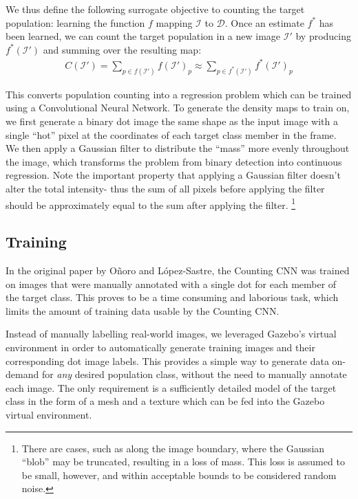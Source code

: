 \documentclass[10pt,twocolumn,letterpaper]{article}
\newcommand{\I}{\mathcal{I}}
\newcommand{\D}{\mathcal{D}}
\begin{document}
  We thus define the following surrogate objective to counting the target
  population: learning the function $f$ mapping $\I$ to $\D$. Once an estimate
  $f^*$ has been learned, we can count the target population in a new image
  $\I'$ by producing $f^*(\I')$ and summing over the resulting map:
  \begin{align}
    C(\I') = \sum_{p \in f(\I')} {f(\I')}_p \approx \sum_{p \in f^*(\I')}
      {f^*(\I')}_p
  \end{align}

  This converts population counting into a regression problem which can be
  trained using a Convolutional Neural Network. To generate the density maps to
  train on, we first generate a binary dot image the same shape as the input
  image with a single ``hot'' pixel at the coordinates of each target class
  member in the frame. We then apply a Gaussian filter to distribute the
  ``mass'' more evenly throughout the image, which transforms the problem from
  binary detection into continuous regression. Note the important property that
  applying a Gaussian filter doesn't alter the total intensity- thus the
  sum of all pixels before applying the filter should be approximately equal to
  the sum after applying the filter. \footnote{There are cases, such as along
  the image boundary, where the Gaussian ``blob'' may be truncated, resulting
  in a loss of mass. This loss is assumed to be small, however, and within
  acceptable bounds to be considered random noise.}


\subsection{Training}


  In the original paper by O\~noro and L\'opez-Sastre, the Counting CNN was
  trained on images that were manually annotated with a single dot for each
  member of the target class. This proves to be a time consuming and laborious
  task, which limits the amount of training data usable by the Counting CNN.

  Instead of manually labelling real-world images, we leveraged Gazebo's
  virtual environment in order to automatically generate training images and
  their corresponding dot image labels. This provides a simple way to generate
  data on-demand for \textit{any} desired population class, without the need to
  manually annotate each image. The only requirement is a sufficiently detailed
  model of the target class in the form of a mesh and a texture which can be
  fed into the Gazebo virtual environment. 
\end{document}
